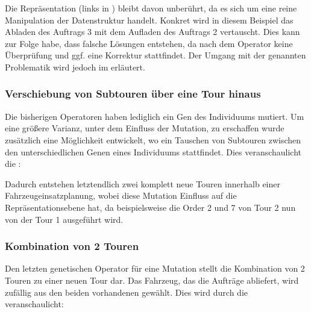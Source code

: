 
Die Repräsentation (links in ) bleibt davon unberührt, da es sich um eine reine Manipulation der Datenstruktur handelt. Konkret wird in diesem Beispiel das Abladen des Auftrags 3 mit dem Aufladen des Auftrags 2 vertauscht. Dies kann zur Folge habe, dass falsche Lösungen entstehen, da nach dem Operator keine Überprüfung und ggf. eine Korrektur stattfindet. Der Umgang mit der genannten Problematik wird jedoch im  erläutert. 

\subsubsection{Verschiebung von Subtouren über eine Tour hinaus}
Die bisherigen Operatoren haben lediglich ein Gen des Individuums mutiert. Um eine größere Varianz, unter dem Einfluss der Mutation, zu erschaffen wurde zusätzlich eine Möglichkeit entwickelt, wo ein Tauschen von Subtouren zwischen den unterschiedlichen Genen eines Individuums stattfindet. Dies veranschaulicht die :


Dadurch entstehen letztendlich zwei komplett neue Touren innerhalb einer Fahrzeugeinsatzplanung, wobei diese Mutation Einfluss auf die Repräsentationsebene hat, da beispielsweise die Order 2 und 7 von Tour 2 nun von der Tour 1 ausgeführt wird. 

\subsubsection{Kombination von 2 Touren}
Den letzten genetischen Operator für eine Mutation stellt die Kombination von 2 Touren zu einer neuen Tour dar. Das Fahrzeug, das die Aufträge abliefert, wird zufällig aus den beiden vorhandenen gewählt. Dies wird durch die  veranschaulicht:


\FloatBarrier
~\newpage
